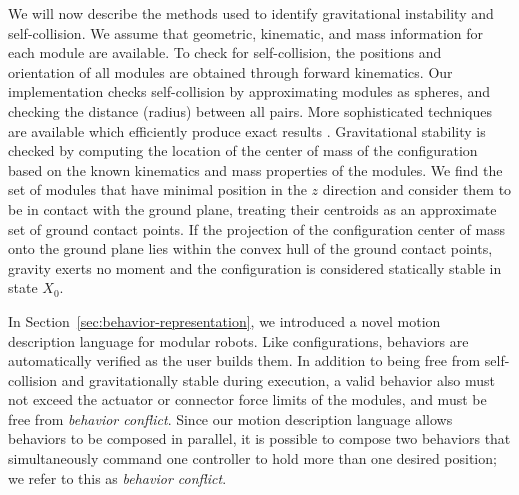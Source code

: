 \documentclass[graybox]{svmult}
\begin{document}
We will now describe the methods used to identify gravitational instability and
self-collision. We assume that geometric, kinematic, and mass
information for each module are available. 
%
To check for self-collision, the positions and orientation of all modules are
obtained  through forward kinematics.
Our implementation checks self-collision by
approximating modules as spheres, and checking the distance (radius) between all
pairs. More sophisticated techniques are available which efficiently produce
exact results \cite{pan2012fcl}.
%
Gravitational stability is checked by computing the location of the center of
mass of the configuration based on the known kinematics and mass properties of 
the modules.
%
We find the set of modules that have minimal position in the $z$ direction and consider them to
be in contact with the ground plane, treating their centroids as an approximate
set of ground contact points.
If the projection of the configuration center of mass onto the ground plane
lies within the convex hull of the ground contact points, gravity exerts no
moment and the configuration
is considered statically stable in state \(X_0\).

In Section~\ref{sec:behavior-representation}, we introduced a novel motion description language for modular robots. Like
configurations, behaviors are automatically verified as the user builds them.
  In addition to being free from self-collision and gravitationally stable during
execution, a valid behavior also must not exceed the actuator or connector force
limits of the modules, and must be free from \textit{behavior conflict}.
Since our motion description language allows behaviors to be composed in parallel,
it is possible to compose two behaviors that simultaneously command one controller
to hold more than one desired position; we refer to this as \textit{behavior
conflict}.
\end{document}
